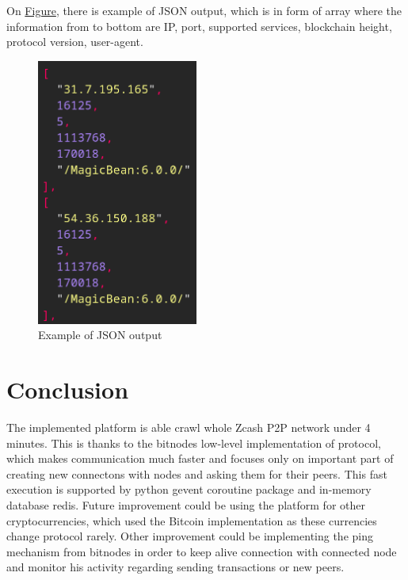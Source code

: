 \documentclass[11pt]{article}
\begin{document}
On \hyperref[fig-output]{Figure}, there is example of JSON output, which is in form of array where the information from to bottom are IP, port, supported services, blockchain height, protocol version, user-agent.
\begin{figure}[htbp]
\centering
\includegraphics[width=200px]{output.png}
\caption{\label{fig-output}Example of JSON output}
\end{figure}



\section{Conclusion}
\label{sec:org3deff5b}
The implemented platform is able crawl whole Zcash P2P network under 4 minutes. This is thanks to the bitnodes low-level implementation of protocol, which makes communication much faster and focuses only on important part of creating new connectons with nodes and asking them for their peers. This fast execution is supported by python gevent coroutine package and in-memory database redis. Future improvement could be using the platform for other cryptocurrencies, which used the Bitcoin implementation as these currencies change protocol rarely. Other improvement could be implementing the ping mechanism from bitnodes in order to keep alive connection with connected node and monitor his activity regarding sending transactions or new peers.
\end{document}
